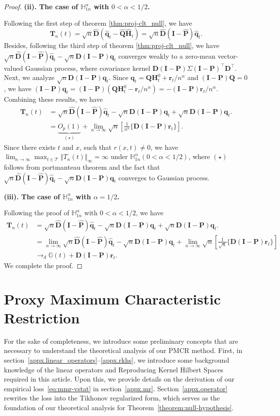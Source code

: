 \documentclass[
  12pt]{article}
\def\to{\rightarrow}
\def\D{\mathbf{D}}
\def\H{\mathbf{H}}
\def\I{\mathbf{I}}
\def\P{\mathbf{P}}
\def\Q{\mathbf{Q}}
\def\q{\mathbf{q}}
\def\r{\mathbf{r}}
\def\T{\mathbf{T}}
\def\wh{\widehat}
\def\mG{\mathbb{G}}
\def\mH{\mathbb{H}}
\def\cT{\mathcal{T}}
\begin{document}
\begin{proof}
\textbf{(ii). The case of $\mH_{1n}^\alpha$ with 
$0<\alpha<1/2$.} 

Following the first step of theorem \ref{thm:proj-clt_null}, we have
$$
\T_n(t) = \sqrt{n}\wh{\D}(\wh{\q}_t-\wh{\Q}\wh{\H}_t) =\sqrt{n}\wh{\D}(\I-\wh{\P})\wh{\q}_t.
$$
Besides, following the third step of theorem \ref{thm:proj-clt_null}, we have $\sqrt{n}\wh{\D}(\I-\wh{\P})\wh{\q}_t-\sqrt{n}\D(\I-\P)\q_t$ converges weakly to a zero-mean vector-valued Gaussian process, where covariance kernel $\D(\I-\P)\Sigma(\I-\P)^\top \D^\top $. Next, we analyze $\sqrt{n}\D(\I-\P)\q_t$. Since $\q_t=\Q\H_t^0+\r_t/n^\alpha$ and $(\I-\P)\Q=0$, we have $(\I-\P)\q_t=(\I-\P)(\Q\H_t^0-\r_t/n^\alpha)=-(\I-\P)\r_t/n^\alpha$. Combining these results, we have
\begin{align*}
    \T_n(t)&=\sqrt{n}\wh{\D}(\I-\wh{\P})\wh{\q}_t-\sqrt{n}\D(\I-\P)\q_t+\sqrt{n}\D(\I-\P)\q_t.\\
    &= \underset{( \star )}{\underbrace{O_p(1)}} +\lim_{n\rightarrow \infty} \sqrt{n}\left[ \frac{1}{n^{\alpha}}\{\D(\I-\P)\r_t\}\right].
\end{align*}
Since there exists $t$ and $x$, such that $r(x,t) \neq 0$, we have $\lim_{n\to \infty} \max_{t \in \cT}\Vert T_n(t) \Vert_\infty = \infty$ under $\mH_{1n}^{\alpha} (0<\alpha<1/2)$, where $(\star )$ follows from portmanteau theorem and the fact that $\sqrt{n}\wh{\D}(\I-\wh{\P})\wh{\q}_t-\sqrt{n}\D(\I-\P)\q_t$ converges to Gaussian process. 

\textbf{(iii). The case of $\mH_{1n}^\alpha$ with $\alpha=1/2$.}

Following the proof of $\mH_{1n}^\alpha$ with $0<\alpha<1/2$, we have
\begin{align*}
    \T_n(t)&=\sqrt{n}\wh{\D}(\I-\wh{\P})\wh{\q}_t-\sqrt{n}\D(\I-\P)\q_t+\sqrt{n}\D(\I-\P)\q_t.\\
    &= \lim_{n\rightarrow \infty}\sqrt{n}\wh{\D}(\I-\wh{\P})\wh{\q}_t-\sqrt{n}\D(\I-\P)\q_t +\lim_{n\rightarrow \infty} \sqrt{n}\left[ \frac{1}{\sqrt{n}}\{\D(\I-\P)\r_t\}\right]\\
    &\to_d \mG(t)+ \D(\I-\P)\r_t.
\end{align*}
We complete the proof. 
\end{proof}

\section{Proxy Maximum Characteristic Restriction}\label{sec.mmr}

For the sake of completeness, we introduce some preliminary concepts that are necessary to understand the theoretical analysis of our PMCR method. First, in section~\ref{appx.linear_operators}--\ref{appx.rkhs}, we introduce some background knowledge of the linear operators and Reproducing Kernel Hilbert Spaces required in this article. Upon this, we provide details on the derivation of our empirical loss~\eqref{eq:mmr-vstat} in section~\ref{appx.mr}. Section~\ref{appx.operator} rewrites the loss into the Tikhonov regularized form, which serves as the foundation of our theoretical analysis for Theorem~\ref{theorem:null-hypothesis}. 
\end{document}
